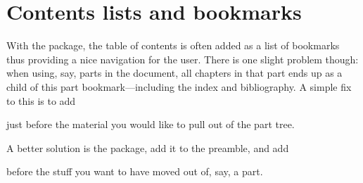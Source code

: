 

\section{Contents lists and bookmarks}
\label{sec:cont-lists-bookm}


With the  package, the table of contents is often
added as a list of bookmarks thus providing a nice navigation for the
user. There is one slight problem though: when using, say, parts in
the document, all chapters in that part ends up as a child of this
part bookmark---including the index and bibliography. A simple fix to
this is to add
\begin{lcode}
  \makeatletter
  \renewcommand*{\toclevel@chapter}{-1}
  \makeatother
\end{lcode}
just before the material you would like to pull out of the part tree.

A better solution is the  package, add it to the
preamble, and add 
\begin{lcode}
\end{lcode}
before the stuff you want to have moved out of, say, a part.


